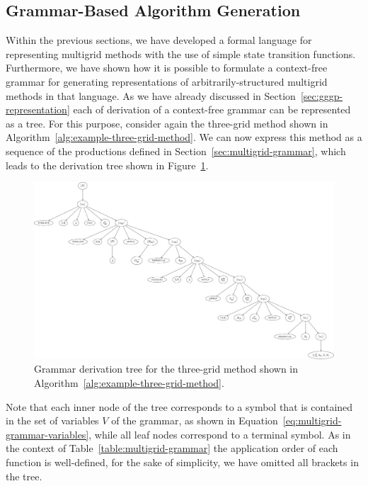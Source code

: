 \subsection{Grammar-Based Algorithm Generation}
\label{sec:grammar-based-algorithm-generation}
Within the previous sections, we have developed a formal language for representing multigrid methods with the use of simple state transition functions.
Furthermore, we have shown how it is possible to formulate a context-free grammar for generating representations of arbitrarily-structured multigrid methods in that language.
As we have already discussed in Section~\ref{sec:gggp-representation} each of derivation of a context-free grammar can be represented as a tree.
For this purpose, consider again the three-grid method shown in Algorithm~\ref{alg:example-three-grid-method}.
We can now express this method as a sequence of the productions defined in Section~\ref{sec:multigrid-grammar}, which leads to the derivation tree shown in Figure~\ref{fig:example-three-grid-method-derivation-tree}.
\begin{figure}
	\centering
	\includegraphics[width=\textwidth]{figures/trees/three_grid_method_grammar_tree.pdf}
	\caption{Grammar derivation tree for the three-grid method shown in Algorithm~\ref{alg:example-three-grid-method}.}
	\label{fig:example-three-grid-method-derivation-tree}
\end{figure}
Note that each inner node of the tree corresponds to a symbol that is contained in the set of variables $V$ of the grammar, as shown in Equation~\eqref{eq:multigrid-grammar-variables}, while all leaf nodes correspond to a terminal symbol.
As in the context of Table~\ref{table:multigrid-grammar} the application order of each function is well-defined, for the sake of simplicity, we have omitted all brackets in the tree.
